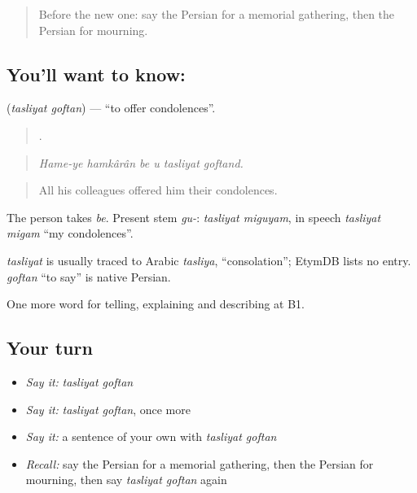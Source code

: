 \label{lesson:FA-C338-tasliyat-goftan}



\begin{quote}
Before the new one: say the Persian for a memorial gathering, then the Persian for mourning.
\end{quote}

\subsection*{You'll want to know:  }
\textbf{ } (\emph{tasliyat goftan}) — \textquotedblleft{}to offer condolences\textquotedblright{}.

\begin{quote}
     .
\end{quote}

\begin{quote}
\emph{Hame-ye hamkârân be u tasliyat goftand.}
\end{quote}

\begin{quote}
All his colleagues offered him their condolences.
\end{quote}

The person takes \emph{be}. Present stem \emph{gu-}: \emph{tasliyat miguyam}, in speech \emph{tasliyat migam} \textquotedblleft{}my condolences\textquotedblright{}.

\begin{cousinweb}
\emph{tasliyat} is usually traced to Arabic \emph{tasliya}, \textquotedblleft{}consolation\textquotedblright{}; EtymDB lists no entry. \emph{goftan} \textquotedblleft{}to say\textquotedblright{} is native Persian.
\end{cousinweb}

\begin{grammarlens}[title={What you've built}]
One more word for telling, explaining and describing at B1.
\end{grammarlens}

\subsection*{Your turn}
\begin{itemize}
\raggedright
  \item \emph{Say it:} \emph{tasliyat goftan}
  \item \emph{Say it:} \emph{tasliyat goftan}, once more
  \item \emph{Say it:} a sentence of your own with \emph{tasliyat goftan}
  \item \emph{Recall:} say the Persian for a memorial gathering, then the Persian for mourning, then say \emph{tasliyat goftan} again
\end{itemize}


